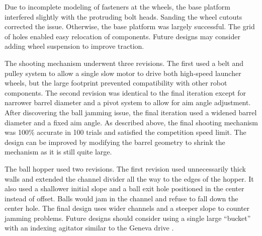 Due to incomplete modeling of fasteners at the wheels, the base platform interfered slightly with the protruding bolt heads. Sanding the wheel cutouts corrected the issue. Otherwise, the base platform was largely successful. The grid of holes enabled easy relocation of components. Future designs may consider adding wheel suspension to improve traction.

The shooting mechanism underwent three revisions. The first used a belt and pulley system to allow a single slow motor to drive both high-speed launcher wheels, but the large footprint prevented compatibility with other robot components. The second revision was identical to the final iteration except for narrower barrel diameter and a pivot system to allow for aim angle adjustment. After discovering the ball jamming issue, the final iteration used a widened barrel diameter and a fixed aim angle. As described above, the final shooting mechanism was 100\% accurate in 100 trials and satisfied the competition speed limit. The design can be improved by modifying the barrel geometry to shrink the mechanism as it is still quite large.

The ball hopper used two revisions. The first revision used unnecessarily thick walls and extended the channel divider all the way to the edges of the hopper. It also used a shallower initial slope and a ball exit hole positioned in the center instead of offset. Balls would jam in the channel and refuse to fall down the center hole. The final design uses wider channels and a steeper slope to counter jamming problems. Future designs should consider using a single large ``bucket'' with an indexing agitator similar to the Geneva drive \cite{bickford_1972}.


